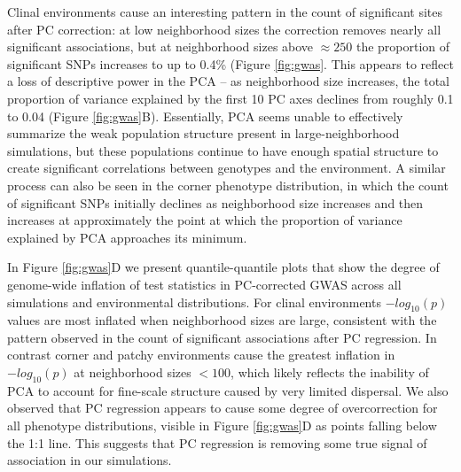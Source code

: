 \documentclass[10pt,twoside,lineno]{gsajnl}
\begin{document}
Clinal environments cause an interesting pattern in the count of significant sites after PC correction: at low neighborhood sizes the correction removes nearly all significant associations, but at neighborhood sizes above $\approx250$ the proportion of significant SNPs increases to up to 0.4\% (Figure \ref{fig:gwas}. This appears to reflect a loss of descriptive power in the PCA -- as neighborhood size increases, the total proportion of variance explained by the first 10 PC axes declines from roughly 0.1 to 0.04 (Figure \ref{fig:gwas}B). Essentially, PCA seems unable to effectively summarize the weak population structure present in large-neighborhood simulations, but these populations continue to have enough spatial structure to create significant correlations between genotypes and the environment. A similar process can also be seen in the corner phenotype distribution, in which the count of significant SNPs initially declines as neighborhood size increases and then increases at approximately the point at which the proportion of variance explained by PCA approaches its minimum. 

In Figure \ref{fig:gwas}D we present quantile-quantile plots that show the degree of genome-wide inflation of test statistics in PC-corrected GWAS across all simulations and environmental distributions. For clinal environments $-log_{10}(p)$ values are most inflated when neighborhood sizes are large, consistent with the pattern observed in the count of significant associations after PC regression. In contrast corner and patchy environments cause the greatest inflation in $-log_{10}(p)$ at neighborhood sizes $<100$, which likely reflects the inability of PCA to account for fine-scale structure caused by very limited dispersal. We also observed that PC regression appears to cause some degree of overcorrection for all phenotype distributions, visible in Figure \ref{fig:gwas}D as points falling below the 1:1 line. This suggests that PC regression is removing some true signal of association in our simulations. 
\end{document}
